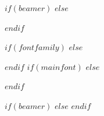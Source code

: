 %
%
$if(beamer)$
$else$
\usepackage[font={stretch=1.2}, textfont={color=caption-color}, position=top, skip=4mm, labelfont=bf, singlelinecheck=true, justification=$if(caption-justification)$$caption-justification$$else$raggedright$endif$]{caption}
\setcapindent{0em}
$endif$


%
%
%
\fi{} %
  $if(fontfamily)$
  $else$
  \usepackage[default, lining]{sourcesanspro}
  \usepackage[scaled=1.05]{beramono}
  $endif$
\else %
  $if(mainfont)$
  $else$


  \usepackage[default, lining]{sourcesanspro}


  \usepackage[nomap, lining, medium, scaled=1.1]{FiraMono}
  \usepackage{fontawesome5}


  $endif$
\fi

%
%
$if(beamer)$
$else$
$endif$

